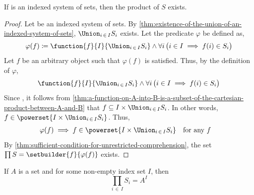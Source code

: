 \begin{thm}
    \label{thm:existence-of-the-product-of-an-indexed-system-of-sets}
    If  is an indexed system of sets, then the product of \( S \) exists.
\end{thm}

\begin{proof}
    Let  be an indexed system of sets. By \cref{thm:existence-of-the-union-of-an-indexed-system-of-sets},
    \( \Union_{i \,\in\, I} S_{i} \) exists. Let the predicate \( \varphi \) be defined as,
    \begin{equation*}
        \varphi(f) \coloneq \function{f}{I}{\Union_{i \,\in\, I} S_{i}}
        \land
        \forall i \, \big( i \in I \implies f(i) \in S_{i} \big)
    \end{equation*}
    Let \( f \) be an arbitrary object such that \( \varphi(f) \) is satisfied. Thus, by the definition of \( \varphi \),
    \begin{equation*}
        \function{f}{I}{\Union_{i \,\in\, I} S_{i}} \land \forall i \, \big( i \in I \implies f(i) \in S_{i} \big)
    \end{equation*}
    Since ,
    it follows from \cref{thm:a-function-on-A-into-B-is-a-subset-of-the-cartesian-product-between-A-and-B}
    that \( f \subseteq I \times \Union_{i \,\in\, I} S_{i} \). In other words, \( f \in \powerset{I \times \Union_{i \,\in\, I} S_{i}} \).
    Thus,
    \begin{equation*}
        \begin{aligned}
            \varphi(f) \implies f \in \powerset{I \times \Union_{i \,\in\, I} S_{i}}&
        \end{aligned}
        \begin{aligned}
            &\text{for any \( f \)}
        \end{aligned}
    \end{equation*}
    By \cref{thm:sufficient-condition-for-unrestricted-comprehension}, the set \( \prod S = \setbuilder{f}{\varphi(f)} \) exists.
\end{proof}

\begin{thm}
    \label{thm:product-of-an-indexed-singleton}
    If \( A \) is a set and  for some non-empty index set \( I \), then
    \begin{equation*}
        \prod_{i \,\in\, I} S_{i} = A^{I}
    \end{equation*}
\end{thm}

